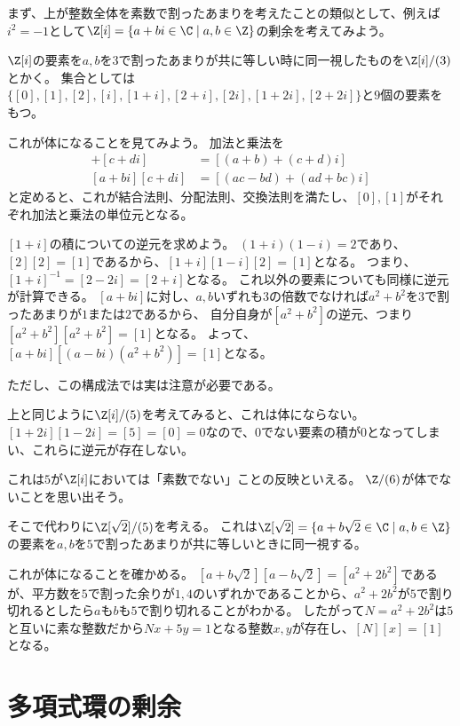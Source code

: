 \documentclass[uplatex]{jsarticle}
\begin{document}
まず、上が整数全体を素数で割ったあまりを考えたことの類似として、例えば$i^2=-1$として$\Z[i]=\{a+bi\in\C\mid a,b\in\Z\}$の剰余を考えてみよう。

\begin{eg}
  $\Z[i]$の要素を$a,b$を$3$で割ったあまりが共に等しい時に同一視したものを$\Z[i]/(3)$とかく。
  集合としては$\{[0],[1],[2],[i],[1+i],[2+i],[2i],[1+2i],[2+2i]\}$と$9$個の要素をもつ。

  これが体になることを見てみよう。
  加法と乗法を
  \begin{align*}
    [a+bi]+[c+di]&=[(a+b)+(c+d)i]\\
    [a+bi][c+di]&=[(ac-bd)+(ad+bc)i]
  \end{align*}
  と定めると、これが結合法則、分配法則、交換法則を満たし、$[0], [1]$がそれぞれ加法と乗法の単位元となる。

  $[1+i]$の積についての逆元を求めよう。
  $(1+i)(1-i)=2$であり、$[2][2]=[1]$であるから、$[1+i][1-i][2]=[1]$となる。
  つまり、$[1+i]^{-1}=[2-2i]=[2+i]$となる。
  これ以外の要素についても同様に逆元が計算できる。
  $[a+bi]$に対し、$a,b$いずれも$3$の倍数でなければ$a^2+b^2$を$3$で割ったあまりが$1$または$2$であるから、
  自分自身が$[a^2+b^2]$の逆元、つまり$[a^2+b^2][a^2+b^2]=[1]$となる。
  よって、$[a+bi][(a-bi)(a^2+b^2)]=[1]$となる。
\end{eg}

ただし、この構成法では実は注意が必要である。

\begin{eg}
  上と同じように$\Z[i]/(5)$を考えてみると、これは体にならない。
  $[1+2i][1-2i]=[5]=[0]=0$なので、$0$でない要素の積が$0$となってしまい、これらに逆元が存在しない。
\end{eg}

これは$5$が$\Z[i]$においては「素数でない」ことの反映といえる。
$\Z/(6)$が体でないことを思い出そう。

\begin{eg}
  そこで代わりに$\Z[\sqrt{2}]/(5)$を考える。
  これは$\Z[\sqrt{2}]=\{a+b\sqrt{2}\in\C\mid a,b\in\Z\}$の要素を$a,b$を$5$で割ったあまりが共に等しいときに同一視する。

  これが体になることを確かめる。
  $[a+b\sqrt{2}][a-b\sqrt{2}]=[a^2+2b^2]$であるが、平方数を$5$で割った余りが$1, 4$のいずれかであることから、$a^2+2b^2$が$5$で割り切れるとしたら$a$も$b$も$5$で割り切れることがわかる。
  したがって$N=a^2+2b^2$は$5$と互いに素な整数だから$Nx+5y=1$となる整数$x,y$が存在し、$[N][x]=[1]$となる。
\end{eg}

\section{多項式環の剰余}
\end{document}
